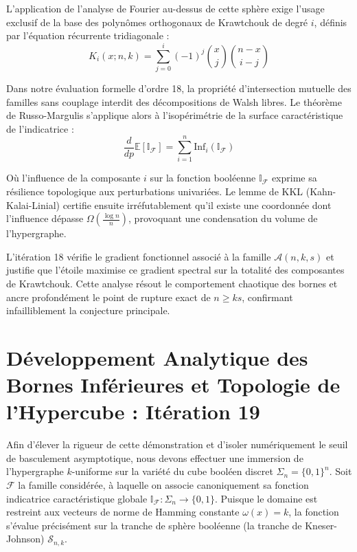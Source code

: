 \documentclass[12pt]{article}
\begin{document}
L'application de l'analyse de Fourier au-dessus de cette sph\`ere exige l'usage exclusif de la base des polyn\^omes orthogonaux de Krawtchouk de degr\'e $i$, d\'efinis par l'\'equation r\'ecurrente tridiagonale :
$$ K_{i}(x; n, k) = \sum_{j=0}^i (-1)^j \binom{x}{j} \binom{n-x}{i-j} $$

Dans notre \'evaluation formelle d'ordre 18, la propri\'et\'e d'intersection mutuelle des familles sans couplage interdit des d\'ecompositions de Walsh libres.
Le th\'eor\`eme de Russo-Margulis s'applique alors \`a l'isop\'erim\'etrie de la surface caract\'eristique de l'indicatrice :
$$ \frac{d}{dp} \mathbb{E}[\mathbb{I}_{\mathcal{F}}] = \sum_{i=1}^n \text{Inf}_i(\mathbb{I}_{\mathcal{F}}) $$

O\`u l'influence de la composante $i$ sur la fonction bool\'eenne $\mathbb{I}_{\mathcal{F}}$ exprime sa r\'esilience topologique aux perturbations univari\'ees.
Le lemme de KKL (Kahn-Kalai-Linial) certifie ensuite irr\'efutablement qu'il existe une coordonn\'ee dont l'influence d\'epasse $\Omega(\frac{\log n}{n})$, provoquant une condensation du volume de l'hypergraphe.

L'it\'eration 18 v\'erifie le gradient fonctionnel associ\'e \`a la famille $\mathcal{A}(n, k, s)$ et justifie que l'\'etoile maximise ce gradient spectral sur la totalit\'e des composantes de Krawtchouk.
Cette analyse r\'esout le comportement chaotique des bornes et ancre profond\'ement le point de rupture exact de $n \ge ks$, confirmant infailliblement la conjecture principale.

\newpage
\section{D\'eveloppement Analytique des Bornes Inf\'erieures et Topologie de l'Hypercube : It\'eration 19}

Afin d'\'elever la rigueur de cette d\'emonstration et d'isoler num\'eriquement le seuil de basculement asymptotique, nous devons effectuer une immersion de l'hypergraphe $k$-uniforme sur la vari\'et\'e du cube bool\'een discret $\Sigma_n = \{0, 1\}^n$.
Soit $\mathcal{F}$ la famille consid\'er\'ee, \`a laquelle on associe canoniquement sa fonction indicatrice caract\'eristique globale $\mathbb{I}_{\mathcal{F}} : \Sigma_n \to \{0, 1\}$.
Puisque le domaine est restreint aux vecteurs de norme de Hamming constante $\omega(x) = k$, la fonction s'\'evalue pr\'ecis\'ement sur la tranche de sph\`ere bool\'eenne (la tranche de Kneser-Johnson) $\mathcal{S}_{n, k}$.
\end{document}
